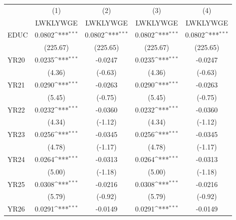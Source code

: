 {
\def\sym#1{\ifmmode^{#1}\else\(^{#1}\)\fi}
\begin{tabular}{l*{4}{c}}
\hline\hline
            &\multicolumn{1}{c}{(1)}&\multicolumn{1}{c}{(2)}&\multicolumn{1}{c}{(3)}&\multicolumn{1}{c}{(4)}\\
            &\multicolumn{1}{c}{LWKLYWGE}&\multicolumn{1}{c}{LWKLYWGE}&\multicolumn{1}{c}{LWKLYWGE}&\multicolumn{1}{c}{LWKLYWGE}\\
\hline
EDUC        &      0.0802\sym{***}&      0.0802\sym{***}&      0.0802\sym{***}&      0.0802\sym{***}\\
            &    (225.67)         &    (225.65)         &    (225.67)         &    (225.65)         \\
[1em]
YR20        &      0.0235\sym{***}&     -0.0247         &      0.0235\sym{***}&     -0.0247         \\
            &      (4.36)         &     (-0.63)         &      (4.36)         &     (-0.63)         \\
[1em]
YR21        &      0.0290\sym{***}&     -0.0263         &      0.0290\sym{***}&     -0.0263         \\
            &      (5.45)         &     (-0.75)         &      (5.45)         &     (-0.75)         \\
[1em]
YR22        &      0.0232\sym{***}&     -0.0360         &      0.0232\sym{***}&     -0.0360         \\
            &      (4.34)         &     (-1.12)         &      (4.34)         &     (-1.12)         \\
[1em]
YR23        &      0.0256\sym{***}&     -0.0345         &      0.0256\sym{***}&     -0.0345         \\
            &      (4.78)         &     (-1.17)         &      (4.78)         &     (-1.17)         \\
[1em]
YR24        &      0.0264\sym{***}&     -0.0313         &      0.0264\sym{***}&     -0.0313         \\
            &      (5.00)         &     (-1.18)         &      (5.00)         &     (-1.18)         \\
[1em]
YR25        &      0.0308\sym{***}&     -0.0216         &      0.0308\sym{***}&     -0.0216         \\
            &      (5.79)         &     (-0.92)         &      (5.79)         &     (-0.92)         \\
[1em]
YR26        &      0.0291\sym{***}&     -0.0149         &      0.0291\sym{***}&     -0.0149         \\

\end{tabular}}
